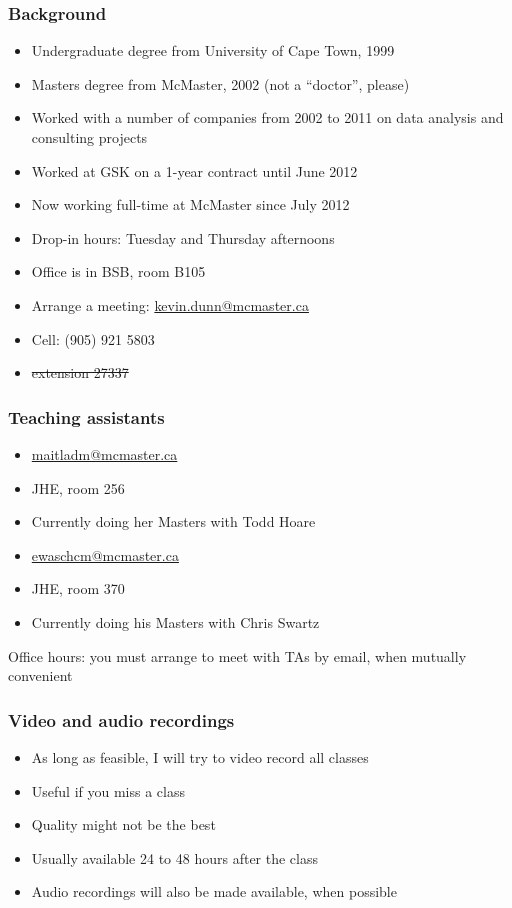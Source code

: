 \begin{frame}\frametitle{Background}
	{\color{myGreen}{About myself}}
	\begin{itemize}
		\item	Undergraduate degree from University of Cape Town, 1999
		\item	Masters degree from McMaster, 2002 (not a ``doctor'', please)
		\item	Worked with a number of companies from 2002 to 2011 on data analysis and consulting projects
		\item	Worked at GSK on a 1-year contract until June 2012
		\item	Now working full-time at McMaster since July 2012
		\item	Drop-in hours: Tuesday and Thursday afternoons
		\item	Office is in BSB, room B105
		\item	Arrange a meeting: \url{kevin.dunn@mcmaster.ca}
		\item	Cell: (905) 921 5803
		\item	\sout{extension 27337}
	\end{itemize}
\end{frame}

\begin{frame}\frametitle{Teaching assistants}
	{\color{myGreen}{Danielle Maitland}}
	\begin{itemize}
		\item	\url{maitladm@mcmaster.ca}
		\item	JHE, room 256
		\item	Currently doing her Masters with Todd Hoare
	\end{itemize}
	\vspace{12pt}
	{\color{myGreen}{Chris Ewaschuk}}
	\begin{itemize}
		\item	\url{ewaschcm@mcmaster.ca}
		\item	JHE, room 370
		\item	Currently doing his Masters with Chris Swartz
	\end{itemize}
	\vspace{12pt}
	Office hours: you must arrange to meet with TAs by email, when mutually convenient
\end{frame}

\begin{frame}\frametitle{Video and audio recordings}
	\begin{itemize}
		\item	As long as feasible, I will try to video record all classes
		\item	Useful if you miss a class
		\item	Quality might not be the best
		\item	Usually available 24 to 48 hours after the class
		\item	Audio recordings will also be made available, when possible
	\end{itemize}
\end{frame}

